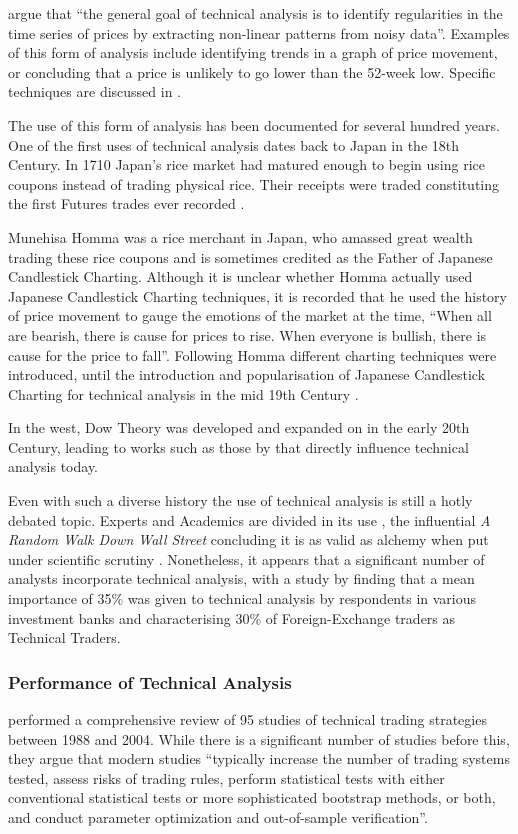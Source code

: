 \documentclass[12pt, oneside, a4paper]{article}
\theoremstyle{definition}
\begin{document}
\cite{foundations} argue that ``the general goal of technical analysis is to identify regularities in the time series of prices by extracting non-linear patterns from noisy data''. Examples of this form of analysis include identifying trends in a graph of price movement, or concluding that a price is unlikely to go lower than the 52-week low. Specific techniques are discussed in .

The use of this form of analysis has been documented for several hundred years. One of the first uses of technical analysis dates back to Japan in the 18th Century. In 1710 Japan's rice market had matured enough to begin using rice coupons instead of trading physical rice. Their receipts were traded constituting the first Futures trades ever recorded \citep[p.~15]{jcct1991}. 

Munehisa Homma was a rice merchant in Japan, who amassed great wealth trading these rice coupons and is sometimes credited as the Father of Japanese Candlestick Charting. Although it is unclear whether Homma actually used Japanese Candlestick Charting techniques, it is recorded that he used the history of price movement to gauge the emotions of the market at the time, ``When all are bearish, there is cause for prices to rise. When everyone is bullish, there is cause for the price to fall''. Following Homma different charting techniques were introduced, until the introduction and popularisation of Japanese Candlestick Charting for technical analysis in the mid 19th Century \citep[p.~18]{jcct1994}.

In the west, Dow Theory was developed and expanded on in the early 20th Century, leading to works such as those by \cite{edwards1948technical} that directly influence technical analysis today.

Even with such a diverse history the use of technical analysis is still a hotly debated topic. Experts and Academics are divided in its use \citep{foundations}, the influential \textit{A Random Walk Down Wall Street} concluding it is as valid as alchemy when put under scientific scrutiny \cite[p.~159]{randomwalk2012}. Nonetheless, it appears that a significant number of analysts incorporate technical analysis, with a study by \cite{examininguse1997} finding that a mean importance of 35\% was given to technical analysis by respondents in various investment banks and \cite{cheung2000currency} characterising 30\% of Foreign-Exchange traders as Technical Traders. 

\subsubsection{Performance of Technical Analysis}
\label{taperformance}
\cite{taprofitability} performed a comprehensive review of 95 studies of technical trading strategies between 1988 and 2004. While there is a significant number of studies before this, they argue that modern studies ``typically increase the number of trading systems tested, assess risks of trading rules,
perform statistical tests with either conventional statistical tests or more sophisticated bootstrap methods, or both, and conduct parameter optimization and out-of-sample verification''.
\end{document}
